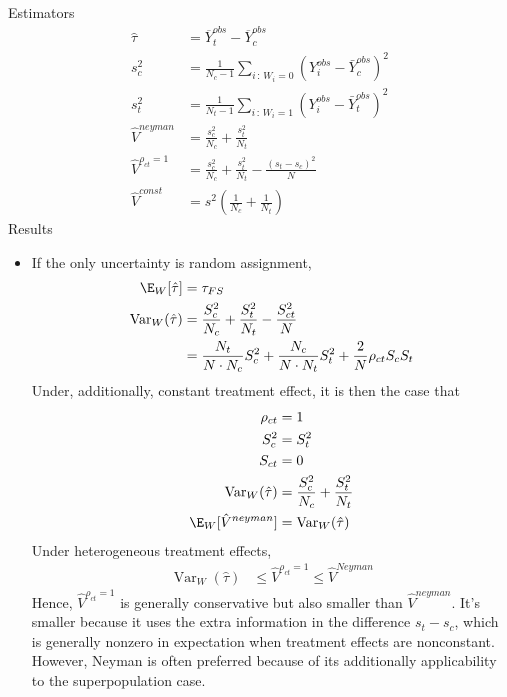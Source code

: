 \documentclass[12pt]{article}
\theoremstyle{plain}
\theoremstyle{definition}
\theoremstyle{remark}
\newcommand{\Var}{\operatorname{Var}}
\begin{document}
Estimators
\begin{align*}
  \hat{\tau}
  &=
  \overline{Y}_t^{obs}
  -
  \overline{Y}_c^{obs}
  \\
  s_c^2
  &=
  \frac{1}{N_c-1}
  \sum_{i\,:\,W_i=0}
  (Y_i^{obs}-\bar{Y}_c^{obs})^2
  \\
  s_t^2
  &=
  \frac{1}{N_t-1}
  \sum_{i\,:\,W_i=1}
  (Y_i^{obs}-\bar{Y}_t^{obs})^2
  \\
  \hat{V}^{neyman}
  &=
  \frac{s_c^2}{N_c}
  +
  \frac{s_t^2}{N_t}
  \\
  \hat{V}^{\rho_{ct}=1}
  &=
  \frac{s_c^2}{N_c}
  +
  \frac{s_t^2}{N_t}
  -
  \frac{(s_t-s_c)^2}{N}
  \\
  \hat{V}^{const}
  &=
  s^2
  \left(
  \frac{1}{N_c}
  +
  \frac{1}{N_t}
  \right)
\end{align*}
Results
\begin{itemize}
  \item
    If the only uncertainty is random assignment,
    \begin{align*}
      \E_W[\hat{\tau}]
      &= \tau_{FS}
      \\
      \Var_W(\hat{\tau})
      &=
      \frac{S_c^2}{N_c}
      +
      \frac{S_t^2}{N_t}
      -
      \frac{S_{ct}^2}{N}
      \\
      &=
      \frac{N_t}{N\cdot N_c}
      S_c^2
      +
      \frac{N_c}{N\cdot N_t}
      S_t^2
      +
      \frac{2}{N}
      \rho_{ct}
      S_cS_t
    \end{align*}
    Under, additionally, constant treatment effect, it is then the case
    that
    \begin{align*}
      \rho_{ct}&=1
      \\
      S_c^2&=S_t^2
      \\
      S_{ct}
      &= 0
      \\
      \Var_W(\hat{\tau})
      &=
      \frac{S_c^2}{N_c}
      +
      \frac{S_t^2}{N_t}
      \\
      \E_W[\hat{V}^{neyman}]
      &=
      \Var_W(\hat{\tau})
    \end{align*}
    Under heterogeneous treatment effects,
    \begin{align*}
      \Var_W(\hat{\tau})
      &\leq
      \hat{V}^{\rho_{ct}=1}
      \leq
      \hat{V}^{Neyman}
    \end{align*}
    Hence, $\hat{V}^{\rho_{ct}=1}$ is generally conservative but also
    smaller than $\hat{V}^{neyman}$.
    It's smaller because it uses the extra information in the difference
    $s_t-s_c$, which is generally nonzero in expectation when treatment
    effects are nonconstant.
    However, Neyman is often preferred because of its additionally
    applicability to the superpopulation case.


\end{itemize}
\end{document}
